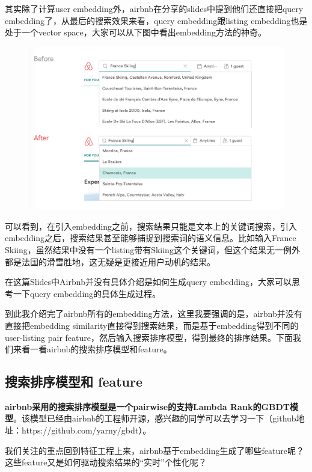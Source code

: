 \documentclass[12pt]{article}
\begin{document}
其实除了计算user embedding外，airbnb在分享的slides中提到他们还直接把query embedding了，从最后的搜索效果来看，query embedding跟listing embedding也是处于一个vector space，大家可以从下图中看出embedding方法的神奇。
\begin{figure}[H]
    \centering
    \includegraphics[width=1\textwidth]{fig/Airbnb_Search_Embedding.jpg}
\end{figure}

可以看到，在引入embedding之前，搜索结果只能是文本上的关键词搜索，引入embedding之后，搜索结果甚至能够捕捉到搜索词的语义信息。比如输入France Skiing，虽然结果中没有一个listing带有Skiing这个关键词，但这个结果无一例外都是法国的滑雪胜地，这无疑是更接近用户动机的结果。

在这篇Slides中Airbnb并没有具体介绍是如何生成query embedding，大家可以思考一下query embedding的具体生成过程。

到此我介绍完了airbnb所有的embedding方法，这里我要强调的是，airbnb并没有直接把embedding similarity直接得到搜索结果，而是基于embedding得到不同的user-listing pair feature，然后输入搜索排序模型，得到最终的排序结果。下面我们来看一看airbnb的搜索排序模型和feature。

\subsection{搜索排序模型和 feature}
\textbf{airbnb采用的搜索排序模型是一个pairwise的支持Lambda Rank的GBDT模型}。该模型已经由airbnb的工程师开源，感兴趣的同学可以去学习一下（github地址：https://github.com/yarny/gbdt）。

我们关注的重点回到特征工程上来，airbnb基于embedding生成了哪些feature呢？这些feature又是如何驱动搜索结果的“实时”个性化呢？
\end{document}
